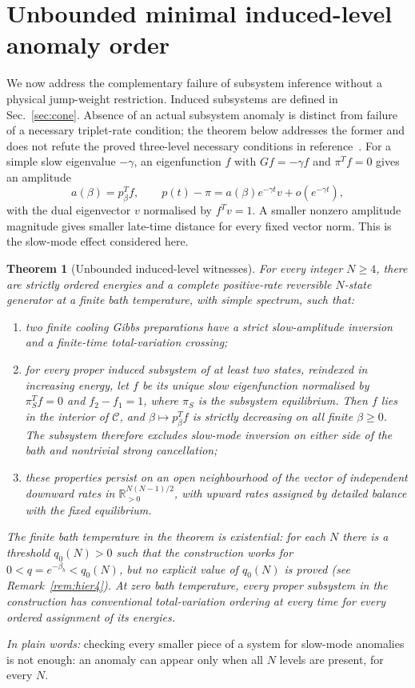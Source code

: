 \documentclass[11pt,a4paper]{article}
\newtheorem{theorem}{Theorem}
\theoremstyle{remark}\newtheorem{remark}[theorem]{Remark}
\newcommand{\C}{\mathcal C}
\newcommand{\R}{\mathbb R}
\newcommand{\takeaway}[1]{\par\smallskip\noindent\textit{In plain words:} #1\par\smallskip}
\begin{document}
\section{Unbounded minimal induced-level anomaly order}\label{sec:hierarchy}
We now address the complementary failure of subsystem inference without a physical jump-weight restriction. Induced subsystems are defined in Sec.~\ref{sec:cone}. Absence of an actual subsystem anomaly is distinct from failure of a necessary triplet-rate condition; the theorem below addresses the former and does not refute the proved three-level necessary conditions in reference~\cite{Avitan2026}. For a simple slow eigenvalue $-\gamma$, an eigenfunction $f$ with $Gf=-\gamma f$ and $\pi^Tf=0$ gives an amplitude
\begin{equation}
 a(\beta)=p_\beta^Tf,\qquad
 p(t)-\pi=a(\beta)e^{-\gamma t}v+o(e^{-\gamma t}),
 \label{eq:slow}
\end{equation}
with the dual eigenvector $v$ normalised by $f^Tv=1$. A smaller nonzero amplitude magnitude gives smaller late-time distance for every fixed vector norm. This is the slow-mode effect considered here.

\begin{theorem}[Unbounded induced-level witnesses]\label{thm:hierarchy}
For every integer $N\ge4$, there are strictly ordered energies and a complete positive-rate reversible $N$-state generator at a finite bath temperature, with simple spectrum, such that:
\begin{enumerate}[label=(\roman*)]
\item two finite cooling Gibbs preparations have a strict slow-amplitude inversion and a finite-time total-variation crossing;
\item for every proper induced subsystem of at least two states, reindexed in increasing energy, let $f$ be its unique slow eigenfunction normalised by $\pi_S^Tf=0$ and $f_2-f_1=1$, where $\pi_S$ is the subsystem equilibrium. Then $f$ lies in the interior of $\C$, and $\beta\mapsto p_\beta^Tf$ is strictly decreasing on all finite $\beta\ge0$. The subsystem therefore excludes slow-mode inversion on either side of the bath and nontrivial strong cancellation;
\item these properties persist on an open neighbourhood of the vector of independent downward rates in $\R_{>0}^{N(N-1)/2}$, with upward rates assigned by detailed balance with the fixed equilibrium.
\end{enumerate}
The finite bath temperature in the theorem is existential: for each $N$ there is a threshold $q_0(N)>0$ such that the construction works for $0<q=e^{-\beta_b}<q_0(N)$, but no explicit value of $q_0(N)$ is proved (see Remark~\ref{rem:hier4}).
At zero bath temperature, every proper subsystem in the construction has conventional total-variation ordering at every time for every ordered assignment of its energies.
\end{theorem}
\takeaway{checking every smaller piece of a system for slow-mode anomalies is not enough: an anomaly can appear only when all $N$ levels are present, for every $N$.}
\end{document}
